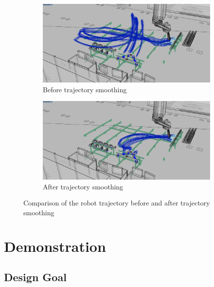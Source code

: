 \begin{figure}[!h]
    \centering
    \begin{subfigure}[b]{0.49\textwidth}
        \centering
        \includegraphics[width=\textwidth]{images/7a/img95.jpg}
        \caption{Before trajectory smoothing}
        \label{fig:before-trajectory-smoothing}
    \end{subfigure}
    \hfill
    \begin{subfigure}[b]{0.49\textwidth}
        \centering
        \includegraphics[width=\textwidth]{images/7a/img96.jpg}
        \caption{After trajectory smoothing}
        \label{fig:after-trajectory-smoothing}
    \end{subfigure}
    \caption{Comparison of the robot trajectory before and after trajectory smoothing}
    \label{fig:comparison-of-trajectory-trajectory-smoothing}
\end{figure}

\FloatBarrier

\section{Demonstration}
\label{section:exploration-4-demonstration}

\subsection{Design Goal}
\label{subsection:exploration-4-design-goal}

